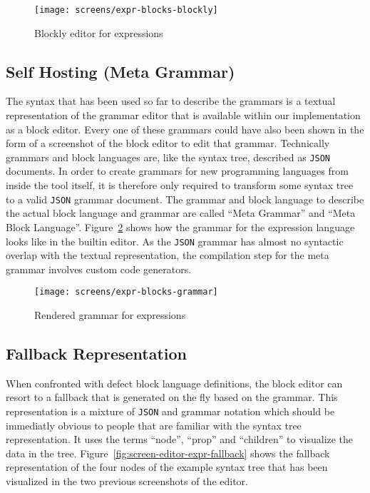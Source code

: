 \documentclass[sigconf,natbib=false,review=true,anonymous]{acmart}
\begin{document}
\begin{figure}[H]
  \texttt{[image: screens/expr-blocks-blockly]}
  \caption{Blockly editor for expressions}
  \label{fig:screen-editor-expr-blockly}
\end{figure}

\subsection{Self Hosting (Meta Grammar)}

The syntax that has been used so far to describe the grammars is a textual representation of the grammar editor that is available within our implementation as a block editor. Every one of these grammars could have also been shown in the form of a screenshot of the block editor to edit that grammar. Technically grammars and block languages are, like the syntax tree, described as \texttt{JSON} documents. In order to create grammars for new programming languages from inside the tool itself, it is therefore only required to transform some syntax tree to a valid \texttt{JSON} grammar document. The grammar and block language to describe the actual block language and grammar are called \enquote{Meta Grammar} and \enquote{Meta Block Language}. Figure~\ref{fig:screen-editor-expr-grammar} shows how the grammar for the expression language looks like in the builtin editor. As the \texttt{JSON} grammar has almost no syntactic overlap with the textual representation, the compilation step for the meta grammar involves custom code generators.

\begin{figure}
  \texttt{[image: screens/expr-blocks-grammar]}
  \caption{Rendered grammar for expressions}
  \label{fig:screen-editor-expr-grammar}
\end{figure}

\subsection{Fallback Representation}

When confronted with defect block language definitions, the block editor can resort to a fallback that is generated on the fly based on the grammar. This representation is a mixture of \texttt{JSON} and grammar notation which should be immediatly obvious to people that are familiar with the syntax tree representation. It uses the terms \enquote{node}, \enquote{prop} and \enquote{children} to visualize the data in the tree. Figure~\ref{fig:screen-editor-expr-fallback} shows the fallback representation of the four nodes of the example syntax tree that has been visualized in the two previous screenshots of the editor.
\end{document}
